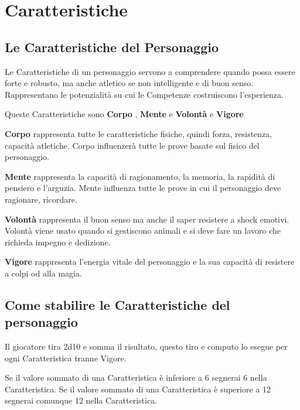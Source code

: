 \documentclass[12pt,a4paper,twoside,openany]{book}
\begin{document}
\pagebreak

\section{Caratteristiche}

\begin{multicols}{2}

\subsection{Le Caratteristiche del Personaggio}

Le Caratteristiche di un personaggio servono a comprendere quando possa essere forte e robusto, ma anche atletico se non intelligente e di buon senso. Rappresentano le potenzialità su cui le Competenze costruiscono l'esperienza.

Queste Caratteristiche sono \textbf{Corpo} , \textbf{Mente}  e \textbf{Volontà}  e \textbf{Vigore}

\textbf{Corpo} rappresenta tutte le caratteristiche fisiche, quindi forza, resistenza, capacità atletiche. Corpo influenzerà tutte le prove basate sul fisico del personaggio.

\textbf{Mente} rappresenta la capacità di ragionamento, la memoria, la rapidità di pensiero e l'arguzia. Mente influenza tutte le prove in cui il personaggio deve ragionare, ricordare.

\textbf{Volontà} rappresenta il buon senso ma anche il saper resistere a shock emotivi. Volontà viene usato quando si gestiscono animali e si deve fare un lavoro che richieda impegno e dedizione.

\textbf{Vigore} rappresenta l'energia vitale del personaggio e la sua capacità di resistere a colpi od alla magia.

\subsection{Come stabilire le Caratteristiche del personaggio}

Il giocatore tira 2d10 e somma il risultato, questo tiro e computo lo esegue per ogni Caratteristica tranne Vigore.

Se il valore sommato di una Caratteristica è inferiore a 6 segnerai 6 nella Caratteristica. Se il valore sommato di una Caratteristica è superiore a 12 segnerai comunque 12 nella Caratteristica.


\end{multicols}
\end{document}
